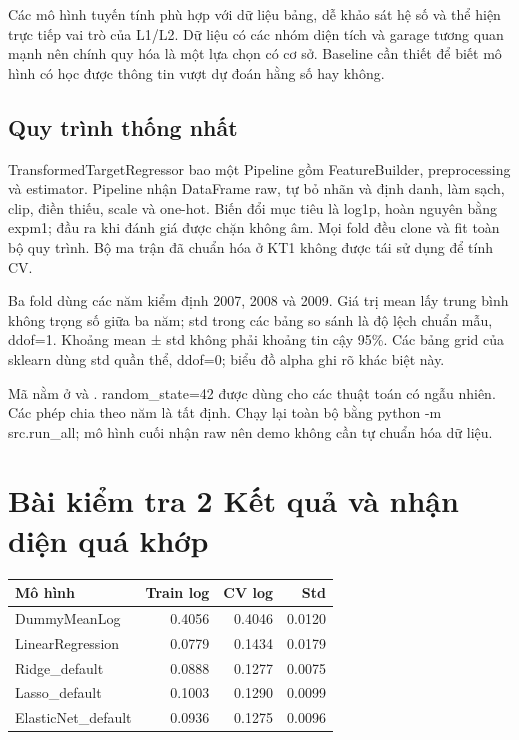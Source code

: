 \documentclass[12pt,a4paper]{article}
\begin{document}
Các mô hình tuyến tính phù hợp với dữ liệu bảng, dễ khảo sát hệ số và thể hiện trực tiếp vai trò của L1/L2. Dữ liệu có các nhóm diện tích và garage tương quan mạnh nên chính quy hóa là một lựa chọn có cơ sở. Baseline cần thiết để biết mô hình có học được thông tin vượt dự đoán hằng số hay không.


\subsection{Quy trình thống nhất}

TransformedTargetRegressor bao một Pipeline gồm FeatureBuilder, preprocessing và estimator. Pipeline nhận DataFrame raw, tự bỏ nhãn và định danh, làm sạch, clip, điền thiếu, scale và one-hot. Biến đổi mục tiêu là log1p, hoàn nguyên bằng expm1; đầu ra khi đánh giá được chặn không âm. Mọi fold đều clone và fit toàn bộ quy trình. Bộ ma trận đã chuẩn hóa ở KT1 không được tái sử dụng để tính CV.


Ba fold dùng các năm kiểm định 2007, 2008 và 2009. Giá trị mean lấy trung bình không trọng số giữa ba năm; std trong các bảng so sánh là độ lệch chuẩn mẫu, ddof=1. Khoảng mean ± std không phải khoảng tin cậy 95\%. Các bảng grid của sklearn dùng std quần thể, ddof=0; biểu đồ alpha ghi rõ khác biệt này.


Mã nằm ở  và . random\_state=42 được dùng cho các thuật toán có ngẫu nhiên. Các phép chia theo năm là tất định. Chạy lại toàn bộ bằng python -m src.run\_all; mô hình cuối nhận raw nên demo không cần tự chuẩn hóa dữ liệu.


\clearpage\section{Bài kiểm tra 2 Kết quả và nhận diện quá khớp}

\begingroup\small\setlength{\tabcolsep}{4pt}\begin{tabularx}{\linewidth}{@{}Yrrr@{}}\toprule

\textbf{Mô hình} & \textbf{Train log} & \textbf{CV log} & \textbf{Std}\\\midrule

DummyMeanLog & 0.4056 & 0.4046 & 0.0120\\

LinearRegression & 0.0779 & 0.1434 & 0.0179\\

Ridge\_default & 0.0888 & 0.1277 & 0.0075\\

Lasso\_default & 0.1003 & 0.1290 & 0.0099\\

ElasticNet\_default & 0.0936 & 0.1275 & 0.0096\\

\bottomrule\end{tabularx}\endgroup\par
\end{document}
